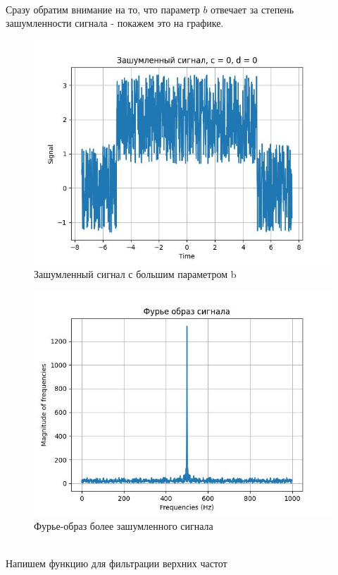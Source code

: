   \\
  \noindent Сразу обратим внимание на то, что параметр $b$ отвечает за степень зашумленности сигнала - покажем это на графике.
  \begin{figure}[!h]
    \centering
    \includegraphics[scale=0.78]{../images/result/original_s2.jpeg}
    \caption{Зашумленный сигнал с большим параметром b}
  \end{figure}
  \begin{figure}[!h]
    \centering
    \includegraphics[scale=0.78]{../images/result/original_s2_fourier.jpeg}
    \caption{Фурье-образ более зашумленного сигнала}
  \end{figure}
  \\
  \noindent Напишем функцию для фильтрации верхних частот
